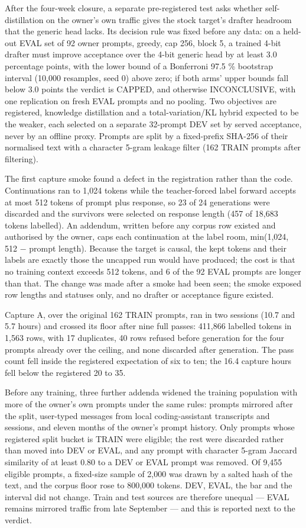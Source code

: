 \documentclass[
  11pt,
]{article}
\newcounter{none} %
\begin{document}
After the four-week closure, a separate pre-registered test asks whether
self-distillation on the owner's own traffic gives the stock target's
drafter headroom that the generic head lacks. Its decision rule was
fixed before any data: on a held-out EVAL set of 92 owner prompts,
greedy, cap 256, block 5, a trained 4-bit drafter must improve
acceptance over the 4-bit generic head by at least 3.0 percentage
points, with the lower bound of a Bonferroni 97.5 \% bootstrap interval
(10,000 resamples, seed 0) above zero; if both arms' upper bounds fall
below 3.0 points the verdict is CAPPED, and otherwise INCONCLUSIVE, with
one replication on fresh EVAL prompts and no pooling. Two objectives are
registered, knowledge distillation and a total-variation/KL hybrid
expected to be the weaker, each selected on a separate 32-prompt DEV set
by served acceptance, never by an offline proxy. Prompts are split by a
fixed-prefix SHA-256 of their normalised text with a character 5-gram
leakage filter (162 TRAIN prompts after filtering).

The first capture smoke found a defect in the registration rather than
the code. Continuations ran to 1,024 tokens while the teacher-forced
label forward accepts at most 512 tokens of prompt plus response, so 23
of 24 generations were discarded and the survivors were selected on
response length (457 of 18,683 tokens labelled). An addendum, written
before any corpus row existed and authorised by the owner, caps each
continuation at the label room, min(1,024, 512 − prompt length). Because
the target is causal, the kept tokens and their labels are exactly those
the uncapped run would have produced; the cost is that no training
context exceeds 512 tokens, and 6 of the 92 EVAL prompts are longer than
that. The change was made after a smoke had been seen; the smoke exposed
row lengths and statuses only, and no drafter or acceptance figure
existed.

Capture A, over the original 162 TRAIN prompts, ran in two sessions
(10.7 and 5.7 hours) and crossed its floor after nine full passes:
411,866 labelled tokens in 1,563 rows, with 17 duplicates, 40 rows
refused before generation for the four prompts already over the ceiling,
and none discarded after generation. The pass count fell inside the
registered expectation of six to ten; the 16.4 capture hours fell below
the registered 20 to 35.

Before any training, three further addenda widened the training
population with more of the owner's own prompts under the same rules:
prompts mirrored after the split, user-typed messages from local
coding-assistant transcripts and sessions, and eleven months of the
owner's prompt history. Only prompts whose registered split bucket is
TRAIN were eligible; the rest were discarded rather than moved into DEV
or EVAL, and any prompt with character 5-gram Jaccard similarity of at
least 0.80 to a DEV or EVAL prompt was removed. Of 9,455 eligible
prompts, a fixed-size sample of 2,000 was drawn by a salted hash of the
text, and the corpus floor rose to 800,000 tokens. DEV, EVAL, the bar
and the interval did not change. Train and test sources are therefore
unequal --- EVAL remains mirrored traffic from late September --- and
this is reported next to the verdict.
\end{document}
